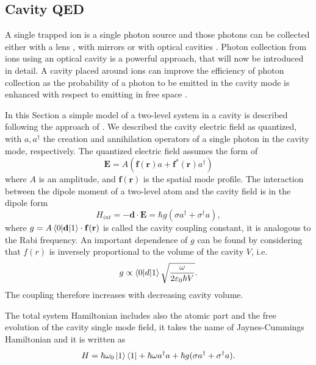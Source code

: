 \subsection{Cavity QED}
\label{sec:cavityqed}
A single trapped ion is a single photon source and those photons can be collected either with a lens \cite{ion_quantumnetwork}, with mirrors \cite{PhysRevLett.120.193603} or with optical cavities \cite{Keller2004bis}. Photon collection from ions using an optical cavity is a powerful approach, that will now be introduced in detail. A cavity placed around ions can improve the efficiency of photon collection as the probability of a photon to be emitted in the cavity mode is enhanced with respect to emitting in free space \cite{Kimble_1998}.\par
In this Section a simple model of a two-level system in a cavity is described following the approach of \cite{steck}. We described the cavity electric field as quantized, with $a,a^\dagger$ the creation and annihilation operators of a single photon in the cavity mode, respectively.
The quantized electric field assumes the form of
\begin{equation}
\mathbf{E} = A(\mathbf{f}(\mathbf{r})a + \mathbf{f}^*(\mathbf{r})a^\dagger)
\end{equation}
where $A$ is an amplitude, and $\mathbf{f}(\mathbf{r})$ is the spatial mode profile. The interaction between the dipole moment of a two-level atom and the cavity field is in the dipole form
\begin{equation}
H_{int}  = -\mathbf{d}\cdot \mathbf{E} = \hbar g (\sigma a^\dagger + \sigma^\dagger a),
\end{equation}
where $g = A \braket{0|\mathbf{d}|1}\cdot \mathbf{f}(\mathbf{r})$ is called the cavity coupling constant, it is analogous to the Rabi frequency. An important dependence of $g$ can be found by considering that $f(r)$ is inversely proportional to the volume of the cavity $V$, i.e.
\begin{equation}
g \propto \braket{0|d|1} \sqrt{\frac{\omega}{2\varepsilon_0 \hbar V}}.
\end{equation}
The coupling therefore increases with decreasing cavity volume.\par
The total system Hamiltonian includes also the atomic part and the free evolution of the cavity single mode field, it takes the name of Jaynes-Cummings Hamiltonian and it is written as \cite{qedreview}
\begin{equation}
\label{eq:jchamiltonian}
H = \hbar \omega_0 \ket{1}\bra{1} + \hbar \omega a^\dagger a + \hbar g (\sigma a^\dagger + \sigma^\dagger a).
\end{equation}
